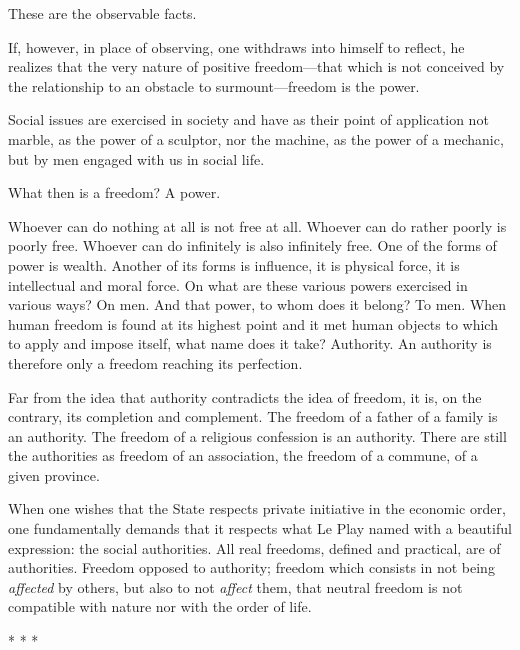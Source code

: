 These are the observable facts.

If, however, in place of observing, one withdraws into himself to reflect, he realizes that the very nature of positive freedom—that which is not conceived by the relationship to an obstacle to surmount—freedom is the power.

Social issues are exercised in society and have as their point of application not marble, as the power of a sculptor, nor the machine, as the power of a mechanic, but by men engaged with us in social life.

What then is a freedom? A power.

Whoever can do nothing at all is not free at all. Whoever can do rather poorly is poorly free. Whoever can do infinitely is also infinitely free. One of the forms of power is wealth. Another of its forms is influence, it is physical force, it is intellectual and moral force. On what are these various powers exercised in various ways? On men. And that power, to whom does it belong? To men. When human freedom is found at its highest point and it met human objects to which to apply and impose itself, what name does it take? Authority. An authority is therefore only a freedom reaching its perfection.

Far from the idea that authority contradicts the idea of freedom, it is, on the contrary, its completion and complement. The freedom of a father of a family is an authority. The freedom of a religious confession is an authority. There are still the authorities as freedom of an association, the freedom of a commune, of a given province.

When one wishes that the State respects private initiative in the economic order, one fundamentally demands that it respects what Le Play named with a beautiful expression: the social authorities. All real freedoms, defined and practical, are of authorities. Freedom opposed to authority; freedom which consists in not being \emph{affected} by others, but also to not \emph{affect} them, that neutral freedom is not compatible with nature nor with the order of life.




\begin{center}* * *\end{center}

